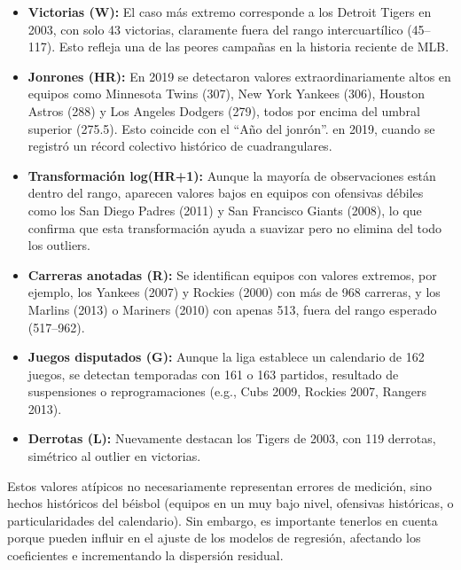 \documentclass[man,floatsintext]{apa7}
\begin{document}
\begin{itemize}
    \item \textbf{Victorias (W):} El caso más extremo corresponde a los Detroit Tigers en 2003, con solo 43 victorias, claramente fuera del rango intercuartílico (45--117). Esto refleja una de las peores campañas en la historia reciente de MLB.
    \item \textbf{Jonrones (HR):} En 2019 se detectaron valores extraordinariamente altos en equipos como Minnesota Twins (307), New York Yankees (306), Houston Astros (288) y Los Angeles Dodgers (279), todos por encima del umbral superior (275.5). Esto coincide con el ``Año del jonrón''. en 2019, cuando se registró un récord colectivo histórico de cuadrangulares.
    \item \textbf{Transformación log(HR+1):} Aunque la mayoría de observaciones están dentro del rango, aparecen valores bajos en equipos con ofensivas débiles como los San Diego Padres (2011) y San Francisco Giants (2008), lo que confirma que esta transformación ayuda a suavizar pero no elimina del todo los outliers.
    \item \textbf{Carreras anotadas (R):} Se identifican equipos con valores extremos, por ejemplo, los Yankees (2007) y Rockies (2000) con más de 968 carreras, y los Marlins (2013) o Mariners (2010) con apenas 513, fuera del rango esperado (517--962).
    \item \textbf{Juegos disputados (G):} Aunque la liga establece un calendario de 162 juegos, se detectan temporadas con 161 o 163 partidos, resultado de suspensiones o reprogramaciones (e.g., Cubs 2009, Rockies 2007, Rangers 2013).
    \item \textbf{Derrotas (L):} Nuevamente destacan los Tigers de 2003, con 119 derrotas, simétrico al outlier en victorias.
\end{itemize}

Estos valores atípicos no necesariamente representan errores de medición, sino hechos históricos del béisbol (equipos en un muy bajo nivel, ofensivas históricas, o particularidades del calendario). Sin embargo, es importante tenerlos en cuenta porque pueden influir en el ajuste de los modelos de regresión, afectando los coeficientes e incrementando la dispersión residual.
\end{document}
